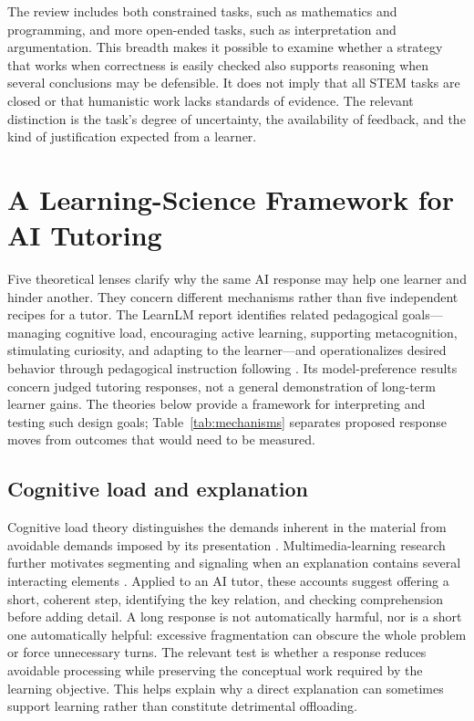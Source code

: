 \documentclass[11pt,a4paper]{article}
\begin{document}
The review includes both constrained tasks, such as mathematics and programming, and more open-ended tasks, such as interpretation and argumentation. This breadth makes it possible to examine whether a strategy that works when correctness is easily checked also supports reasoning when several conclusions may be defensible. It does not imply that all STEM tasks are closed or that humanistic work lacks standards of evidence. The relevant distinction is the task's degree of uncertainty, the availability of feedback, and the kind of justification expected from a learner.

\section{A Learning-Science Framework for AI Tutoring}
Five theoretical lenses clarify why the same AI response may help one learner and hinder another. They concern different mechanisms rather than five independent recipes for a tutor. The LearnLM report identifies related pedagogical goals---managing cognitive load, encouraging active learning, supporting metacognition, stimulating curiosity, and adapting to the learner---and operationalizes desired behavior through pedagogical instruction following \cite{P35}. Its model-preference results concern judged tutoring responses, not a general demonstration of long-term learner gains. The theories below provide a framework for interpreting and testing such design goals; Table~\ref{tab:mechanisms} separates proposed response moves from outcomes that would need to be measured.

\subsection{Cognitive load and explanation}
Cognitive load theory distinguishes the demands inherent in the material from avoidable demands imposed by its presentation \cite{T01}. Multimedia-learning research further motivates segmenting and signaling when an explanation contains several interacting elements \cite{T02}. Applied to an AI tutor, these accounts suggest offering a short, coherent step, identifying the key relation, and checking comprehension before adding detail. A long response is not automatically harmful, nor is a short one automatically helpful: excessive fragmentation can obscure the whole problem or force unnecessary turns. The relevant test is whether a response reduces avoidable processing while preserving the conceptual work required by the learning objective. This helps explain why a direct explanation can sometimes support learning rather than constitute detrimental offloading.
\end{document}
